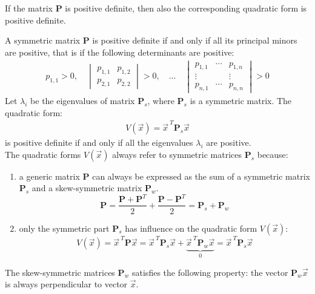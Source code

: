 \documentclass[11pt,a4paper,oneside]{book}
\numberwithin{equation}{section}
\theoremstyle{it}
\theoremstyle{definition}
\begin{document}
If the matrix $\mathbf{P}$ is positive definite, then  also the corresponding 
quadratic form is positive definite.

A symmetric matrix $\mathbf{P}$ is positive definite if and only if all its 
principal minors are positive, that is if the following determinants are 
positive:
\begin{equation}\label{eqlyap11}
	\begin{aligned}
		p_{1,1} > 0, \quad
		\begin{vmatrix}
			p_{1,1} & p_{1,2} \\[6pt]
			p_{2,1} & p_{2,2}
		\end{vmatrix} > 0,\quad...\quad
		\begin{vmatrix}
			p_{1,1} & \cdots & p_{1,n} \\[6pt]
			\vdots & &\vdots \\[6pt]
			p_{n,1} & \cdots & p_{n,n}
		\end{vmatrix} > 0
	\end{aligned}
\end{equation}
Let $\lambda_i$ be the eigenvalues of matrix $\mathbf{P}_s$, where 
$\mathbf{P}_s$ is a symmetric matrix. The quadratic form:
\begin{equation}\label{eqlyap12}
	\begin{aligned}
		V(\vec{x}) = \vec{x}^{\ T}\mathbf{P}_s\vec{x}
	\end{aligned}
\end{equation}
is positive definite if and only if all the eigenvalues $\lambda_i$ are 
positive. \\
The quadratic forms $V(\vec{x})$ always refer to symmetric matrices 
$\mathbf{P}_s$ because:
\begin{enumerate}
	\item a generic matrix $\mathbf{P}$ can always be expressed as the sum of a 
	symmetric matrix $\mathbf{P}_s$ and a skew-symmetric matrix $\mathbf{P}_w$.
	\begin{equation*}
		\mathbf{P}=\frac{\mathbf{P}+\mathbf{P}^T}{2}+\frac{\mathbf{P}- 
		\mathbf{P}^T}{2}=\mathbf{P}_s+\mathbf{P}_w
	\end{equation*}
	\item only the symmetric part $\mathbf{P}_s$ has influence on the quadratic 
	form $V(\vec{x})$:
	\begin{equation*}
		V(\vec{x}) = \vec{x}^{\ T}\mathbf{P}\vec{x}=\vec{x}^{\ 
		T}\mathbf{P}_s\vec{x}+\underbrace{\vec{x}^{\ 
		T}\mathbf{P}_w\vec{x}}_0=\vec{x}^{\ T}\mathbf{P}_s\vec{x}
	\end{equation*}
\end{enumerate}
The skew-symmetric matrices $\mathbf{P}_w$ satisfies the following property: 
the vector $\mathbf{P}_w\vec{x}$ is always perpendicular to vector $\vec{x}$.
\end{document}
